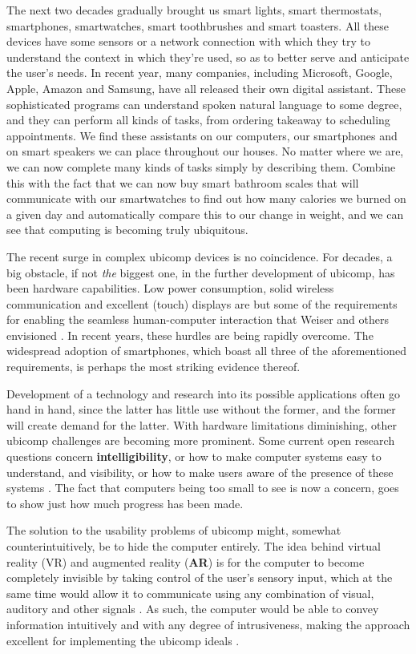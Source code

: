 The next two decades gradually brought us smart lights, smart thermostats, smartphones, smartwatches, smart toothbrushes and smart toasters. All these devices have some sensors or a network connection with which they try to understand the context in which they're used, so as to better serve and anticipate the user's needs. In recent year, many companies, including Microsoft, Google, Apple, Amazon and Samsung, have all released their own digital assistant. These sophisticated programs can understand spoken natural language to some degree, and they can perform all kinds of tasks, from ordering takeaway to scheduling appointments. We find these assistants on our computers, our smartphones and on smart speakers we can place throughout our houses. No matter where we are, we can now complete many kinds of tasks simply by describing them. Combine this with the fact that we can now buy smart bathroom scales that will communicate with our smartwatches to find out how many calories we burned on a given day and automatically compare this to our change in weight, and we can see that computing is becoming truly ubiquitous.

The recent surge in complex ubicomp devices is no coincidence. For decades, a big obstacle, if not \textit{the} biggest one, in the further development of ubicomp, has been hardware capabilities. Low power consumption, solid wireless communication and excellent (touch) displays are but some of the requirements for enabling the seamless human-computer interaction that Weiser and others envisioned \cite{weiser1993some}. In recent years, these hurdles are being rapidly overcome. The widespread adoption of smartphones, which boast all three of the aforementioned requirements, is perhaps the most striking evidence thereof.

Development of a technology and research into its possible applications often go hand in hand, since the latter has little use without the former, and the former will create demand for the latter. With hardware limitations diminishing, other ubicomp challenges are becoming more prominent. Some current open research questions concern \textbf{intelligibility}, or how to make computer systems easy to understand, and visibility, or how to make users aware of the presence of these systems \cite{vermeulen2009bet,vermeulen2013intelligibility}. The fact that computers being too small to see is now a concern, goes to show just how much progress has been made.

The solution to the usability problems of ubicomp might, somewhat counterintuitively, be to hide the computer entirely. The idea behind virtual reality (VR) and augmented reality (\textbf{AR}) is for the computer to become completely invisible by taking control of the user's sensory input, which at the same time would allow it to communicate using any combination of visual, auditory and other signals \cite{rheingold1991virtual}. As such, the computer would be able to convey information intuitively and with any degree of intrusiveness, making the approach excellent for implementing the ubicomp ideals \cite{weiser1993some}.

